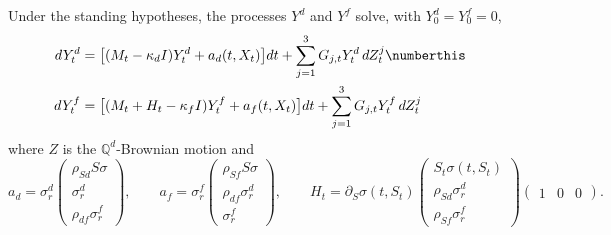 \begin{prop}\label{prop: integratedSensitivities}
Under the standing hypotheses, the processes $Y^d$ and $Y^f$ solve, with $Y^d_0=Y^f_0=0$,
\begin{align*}
dY_t^d &=\big[(M_t-\kappa_d I)Y_t^d+a_d(t,X_t)\big]dt +\sum_{j=1}^3G_{j,t}Y_t^d\,dZ_t^j \numberthis\label{eq: matrixSystem}\\
dY_t^f &=\big[(M_t+H_t-\kappa_f I)Y_t^f+a_f(t,X_t)\big]dt +\sum_{j=1}^3G_{j,t}Y_t^f\,dZ_t^j
\end{align*}
where $Z$ is the $\mathbb{Q}^d$-Brownian motion and
$$ a_d=\sigma^d_r\begin{pmatrix}\rho_{Sd}S\sigma\\ \sigma^d_r\\ \rho_{df}\sigma^f_r\end{pmatrix},\qquad
a_f=\sigma^f_r\begin{pmatrix}\rho_{Sf}S\sigma\\ \rho_{df}\sigma^d_r\\ \sigma^f_r\end{pmatrix},\qquad
H_t=\partial_S\sigma(t,S_t)\begin{pmatrix}S_t\sigma(t,S_t)\\ \rho_{Sd}\sigma^d_r\\ \rho_{Sf}\sigma^f_r\end{pmatrix}\begin{pmatrix}1&0&0\end{pmatrix}. $$
\end{prop}
